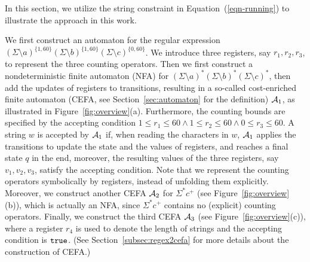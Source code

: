 

In this section, we utilize the string constraint in Equation~(\ref{eqn-running}) to illustrate the approach in this work.


We first construct an automaton for the regular expression $(\Sigma \setminus a)^{\{1, 60\}} (\Sigma \setminus b)^{\{1, 60\}} (\Sigma \setminus c)^{\{0, 60\}}$. We introduce three registers, say $r_1, r_2, r_3$, to represent the three counting operators.  
Then we first construct a nondeterministic finite automaton (NFA) for $(\Sigma \setminus a)^* (\Sigma \setminus b)^* (\Sigma \setminus c)^*$, then add the updates of registers to transitions, resulting in a so-called cost-enriched finite automaton (CEFA, see Section~\ref{sec:automaton} for the definition) $\mathcal{A}_1$,  as illustrated in Figure~\ref{fig:overview}(a). 
Furthermore, the counting bounds are specified by the accepting condition $1 \le r_1 \le 60 \wedge 1 \le r_2 \le 60 \wedge 0 \le r_3 \le 60$. 
A string $w$ is accepted by $\mathcal{A}_1$ if, when reading the characters in $w$, $\mathcal{A}_1$ applies the transitions to update the state and the values of registers, and reaches a final state $q$ in the end, moreover, the resulting values of the three registers, say $v_1, v_2, v_3$, satisfy the accepting condition. 
Note that we represent the counting operators symbolically by registers, instead of unfolding them explicitly. 
Moreover, we construct another CEFA $\mathcal{A}_2$ for $\Sigma^* c^+$ (see Figure~\ref{fig:overview}(b)), which is actually an NFA, since $\Sigma^* c^+$ contains no (explicit) counting operators. Finally, we construct the third CEFA $\mathcal{A}_3$ (see Figure~\ref{fig:overview}(c)), where a register $r_4$ is used to denote the length of strings and the accepting condition is $\mathtt{true}$. (See Section~\ref{subsec:regex2cefa} for more details about the construction of CEFA.)

